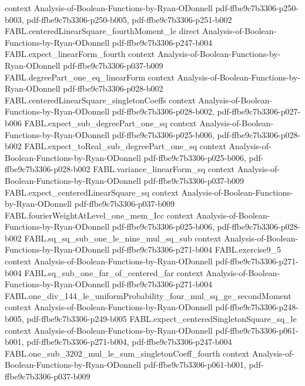 \begin{theorem}
  {context}
  {Analysis-of-Boolean-Functions-by-Ryan-ODonnell}
  {pdf-ffbe9c7b3306-p250-b003,
    pdf-ffbe9c7b3306-p250-b005,
    pdf-ffbe9c7b3306-p251-b002}
\proofstep
  {FABL.centeredLinearSquare_fourthMoment_le}
  {direct}
  {Analysis-of-Boolean-Functions-by-Ryan-ODonnell}
  {pdf-ffbe9c7b3306-p247-b004}
\proofstep
  {FABL.expect_linearForm_fourth}
  {context}
  {Analysis-of-Boolean-Functions-by-Ryan-ODonnell}
  {pdf-ffbe9c7b3306-p037-b009}
\proofstep
  {FABL.degreePart_one_eq_linearForm}
  {context}
  {Analysis-of-Boolean-Functions-by-Ryan-ODonnell}
  {pdf-ffbe9c7b3306-p028-b002}
\proofstep
  {FABL.centeredLinearSquare_singletonCoeffs}
  {context}
  {Analysis-of-Boolean-Functions-by-Ryan-ODonnell}
  {pdf-ffbe9c7b3306-p028-b002,
    pdf-ffbe9c7b3306-p027-b006}
\proofstep
  {FABL.expect_sub_degreePart_one_sq}
  {context}
  {Analysis-of-Boolean-Functions-by-Ryan-ODonnell}
  {pdf-ffbe9c7b3306-p025-b006,
    pdf-ffbe9c7b3306-p028-b002}
\proofstep
  {FABL.expect_toReal_sub_degreePart_one_sq}
  {context}
  {Analysis-of-Boolean-Functions-by-Ryan-ODonnell}
  {pdf-ffbe9c7b3306-p025-b006,
    pdf-ffbe9c7b3306-p028-b002}
\proofstep
  {FABL.variance_linearForm_sq}
  {context}
  {Analysis-of-Boolean-Functions-by-Ryan-ODonnell}
  {pdf-ffbe9c7b3306-p037-b009}
\proofstep
  {FABL.expect_centeredLinearSquare_sq}
  {context}
  {Analysis-of-Boolean-Functions-by-Ryan-ODonnell}
  {pdf-ffbe9c7b3306-p037-b009}
\proofstep
  {FABL.fourierWeightAtLevel_one_mem_Icc}
  {context}
  {Analysis-of-Boolean-Functions-by-Ryan-ODonnell}
  {pdf-ffbe9c7b3306-p025-b006,
    pdf-ffbe9c7b3306-p028-b002}
\proofstep
  {FABL.sq_sq_sub_one_le_nine_mul_sq_sub}
  {context}
  {Analysis-of-Boolean-Functions-by-Ryan-ODonnell}
  {pdf-ffbe9c7b3306-p271-b004}
\proofstep
  {FABL.exercise9_5}
  {context}
  {Analysis-of-Boolean-Functions-by-Ryan-ODonnell}
  {pdf-ffbe9c7b3306-p271-b004}
\proofstep
  {FABL.sq_sub_one_far_of_centered_far}
  {context}
  {Analysis-of-Boolean-Functions-by-Ryan-ODonnell}
  {pdf-ffbe9c7b3306-p271-b004}
\proofstep
  {FABL.one_div_144_le_uniformProbability_four_mul_sq_ge_secondMoment}
  {context}
  {Analysis-of-Boolean-Functions-by-Ryan-ODonnell}
  {pdf-ffbe9c7b3306-p248-b005,
    pdf-ffbe9c7b3306-p249-b005}
\proofstep
  {FABL.expect_centeredSingletonSquare_sq_le}
  {context}
  {Analysis-of-Boolean-Functions-by-Ryan-ODonnell}
  {pdf-ffbe9c7b3306-p061-b001,
    pdf-ffbe9c7b3306-p271-b004,
    pdf-ffbe9c7b3306-p247-b004}
\proofstep
  {FABL.one_sub_3202_mul_le_sum_singletonCoeff_fourth}
  {context}
  {Analysis-of-Boolean-Functions-by-Ryan-ODonnell}
  {pdf-ffbe9c7b3306-p061-b001,
    pdf-ffbe9c7b3306-p037-b009}

\end{theorem}
